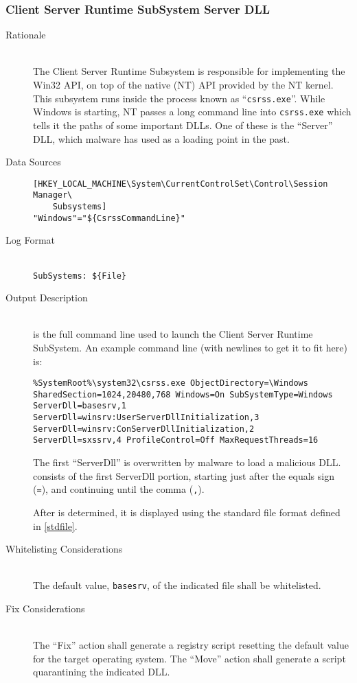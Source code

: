 \subsubsection{Client Server Runtime SubSystem Server DLL}
\begin{description}
\item[Rationale] \hfill \\
The Client Server Runtime Subsystem is responsible for implementing the Win32
API, on top of the native (NT) API provided by the NT kernel. This subsystem
runs inside the process known as ``\verb|csrss.exe|''. While Windows is
starting, NT passes a long command line into \verb|csrss.exe| which tells it the
paths of some important DLLs. One of these is the ``Server'' DLL, which
malware has used as a loading point in the past.
\item[Data Sources] \hfill
\vspace{-\baselineskip}
\begin{verbatim}
[HKEY_LOCAL_MACHINE\System\CurrentControlSet\Control\Session Manager\
    Subsystems]
"Windows"="${CsrssCommandLine}"
\end{verbatim}
\item[Log Format] \hfill \\
\verb|SubSystems: ${File}|
\item[Output Description] \hfill \\
 is the full command line used to launch the Client Server
Runtime SubSystem. An example command line (with newlines to get it to fit here)
is:
\begin{verbatim}
%SystemRoot%\system32\csrss.exe ObjectDirectory=\Windows
SharedSection=1024,20480,768 Windows=On SubSystemType=Windows
ServerDll=basesrv,1
ServerDll=winsrv:UserServerDllInitialization,3
ServerDll=winsrv:ConServerDllInitialization,2
ServerDll=sxssrv,4 ProfileControl=Off MaxRequestThreads=16
\end{verbatim}

The first ``ServerDll'' is overwritten by malware to load a malicious DLL.
\var{File} consists of the first ServerDll portion, starting just after the
equals sign (\verb|=|), and continuing until the comma (\verb|,|).

After  is determined, it is displayed using the standard file format
defined in \ref{stdfile}.
\item[Whitelisting Considerations] \hfill \\
The default value, \verb|basesrv|, of the indicated file shall be whitelisted.
\item[Fix Considerations] \hfill \\
The ``Fix'' action shall generate a registry script resetting the default
value for the target operating system. The ``Move'' action shall generate a
script quarantining the indicated DLL.
\end{description}

